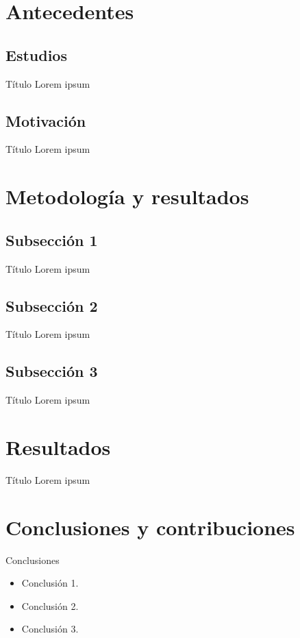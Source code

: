 \documentclass[9pt]{beamer}
\begin{document}
\section{Antecedentes}
\subsection{Estudios}
\begin{frame}{Título}
	Lorem ipsum
\end{frame}

\subsection{Motivación}
\begin{frame}{Título}
	Lorem ipsum
\end{frame}


\section{Metodología y resultados}
\subsection{Subsección 1}
\begin{frame}{Título}
	Lorem ipsum
\end{frame}

\subsection{Subsección 2}
\begin{frame}{Título}
	Lorem ipsum
\end{frame}

\subsection{Subsección 3}
\begin{frame}{Título}
	Lorem ipsum
\end{frame}

\section{Resultados}
\begin{frame}{Título}
	Lorem ipsum
\end{frame}

\section{Conclusiones y contribuciones}
\begin{frame}{Conclusiones}
	\begin{itemize}
		\item Conclusión 1.
		\item Conclusión 2.
		\item Conclusión 3.
	\end{itemize}
\end{frame}
\end{document}
